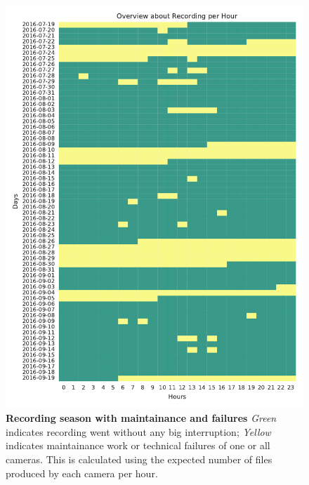 \begin{figure}[htb]
	\centering
	\includegraphics[width=1.0\textwidth]{Figures/recording}
	\caption[Recording season with maintainance and failures]{\textbf{Recording season with maintainance and failures} \emph{Green} indicates recording went without any big interruption; \emph{Yellow} indicates maintainance work or technical failures of one or all cameras. This is calculated using the expected number of files produced by each camera per hour.}
	\label{fig:observation-period}
\end{figure}